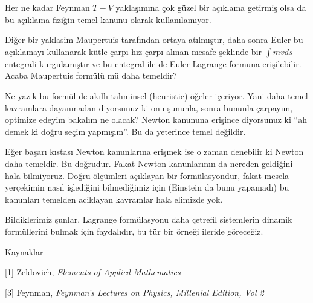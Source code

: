 \documentclass[12pt,fleqn]{article}\usepackage{../../common}
\begin{document}
Her ne kadar Feynman $T - V$ yaklaşımına çok güzel bir açıklama getirmiş olsa da
bu açıklama fiziğin temel kanunu olarak kullanılamıyor.

Diğer bir yaklasim Maupertuis tarafından ortaya atılmıştır, daha sonra Euler bu
açıklamayı kullanarak kütle çarpı hız çarpı alınan mesafe şeklinde bir $\int
mvds$ entegrali kurgulamıştır ve bu entegral ile de Euler-Lagrange formuna
erişilebilir. Acaba Maupertuis formülü mü daha temeldir?

Ne yazık bu formül de akıllı tahminsel (heuristic) öğeler içeriyor. Yani daha
temel kavramlara dayanmadan diyorsunuz ki onu şununla, sonra bununla çarpayım,
optimize edeyim bakalım ne olacak?  Newton kanununa erişince diyorsunuz ki ``ah
demek ki doğru seçim yapmışım''. Bu da yeterince temel değildir.

Eğer başarı kıstası Newton kanunlarına erişmek ise o zaman denebilir ki Newton
daha temeldir. Bu doğrudur. Fakat Newton kanunlarının da nereden geldiğini hala
bilmiyoruz. Doğru ölçümleri açıklayan bir formülasyondur, fakat mesela
yerçekimin nasıl işlediğini bilmediğimiz için (Einstein da bunu yapamadı)
bu kanunları temelden aciklayan kavramlar hala elimizde yok.

Bildiklerimiz şunlar, Lagrange formülasyonu daha çetrefil sistemlerin dinamik
formüllerini bulmak için faydalıdır, bu tür bir örneği ileride göreceğiz.

Kaynaklar

[1] Zeldovich, {\em Elements of Applied Mathematics}

[3] Feynman, {\em Feynman's Lectures on Physics, Millenial Edition, Vol 2}
\end{document}
